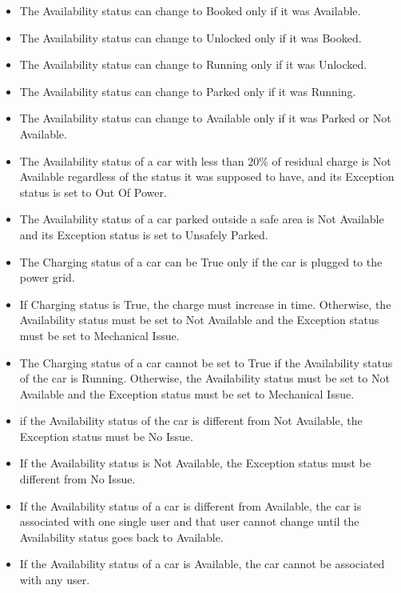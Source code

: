 \documentclass[11pt]{article} %
\begin{document}
\begin{itemize}
	\item The Availability status can change to Booked only if it was Available.
	\item The Availability status can change to Unlocked only if it was Booked.
	\item The Availability status can change to Running only if it was Unlocked.
	\item The Availability status can change to Parked only if it was Running.
	\item  The Availability status can change to Available only if it was Parked or Not Available.
	\item The Availability status of a car with less than 20\% of residual charge is Not Available regardless of the status it was supposed to have, and its Exception status is set to Out Of Power.
	\item The Availability status of a car parked outside a safe area is Not Available and its Exception status is set to Unsafely Parked.
	\item The Charging status of a car can be True only if the car is plugged to the power grid.
	\item If Charging status is True, the charge must increase in time. Otherwise, the Availability status must be set to Not Available and the Exception status must be set to Mechanical Issue. 
	\item The Charging status of a car cannot be set to True if the Availability status of the car is Running. Otherwise, the Availability status must be set to Not Available and the Exception status must be set to Mechanical Issue. 
	\item if the Availability status of the car is different from Not Available, the Exception status must be No Issue.
	\item If the Availability status is Not Available, the Exception status must be different from No Issue.
	\item If the Availability status of a car is different from Available, the car is associated with one single user and that user cannot change until the Availability status goes back to Available.
	\item If the Availability status of a car is Available, the car cannot be associated with any user.
\end{itemize}
	
  
\end{document}
